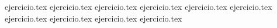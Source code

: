 \vspace{0.3cm}
\begin{enumerate}
    \setcounter{enumi}{66}
    {ejercicio.tex}
{ejercicio.tex}
{ejercicio.tex}
{ejercicio.tex}
{ejercicio.tex}
{ejercicio.tex}
{ejercicio.tex}
{ejercicio.tex}
{ejercicio.tex}
{ejercicio.tex}
\end{enumerate}
